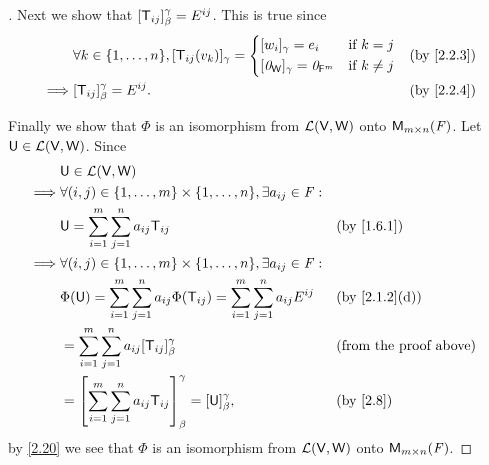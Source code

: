 \begin{proof}[]
  Next we show that \([\mathsf{T}_{i j}]_{\beta}^{\gamma} = E^{i j}\).
  This is true since
  \begin{align*}
             & \forall k \in \set{1, \dots, n}, [\T_{i j}(v_k)]_{\gamma} = \begin{dcases}
                                                                             [w_i]_{\gamma} = e_i                 & \text{if } k = j    \\
                                                                             [\zv_{\W}]_{\gamma} = \zv_{\vs{F}^m} & \text{if } k \neq j
                                                                           \end{dcases} &  & \text{(by \cref{2.2.3})} \\
    \implies & [\T_{i j}]_{\beta}^{\gamma} = E^{i j}.                                       &  & \text{(by \cref{2.2.4})}
  \end{align*}

  Finally we show that \(\Phi\) is an isomorphism from \(\mathcal{L}(\mathsf{V}, \mathsf{W})\) onto \(\mathsf{M}_{{m} \times n}({\mathit{F}})\).
  Let \(\mathsf{U} \in \mathcal{L}(\mathsf{V}, \mathsf{W})\).
  Since
  \begin{align*}
             & \U \in \ls(\V, \W)                                                                                                                                 \\
    \implies & \forall (i, j) \in \set{1, \dots, m} \times \set{1, \dots, n}, \exists a_{i j} \in \F :                                                            \\
             & \U = \sum_{i = 1}^m \sum_{j = 1}^n a_{i j} \T_{i j}                                                             &  & \text{(by \cref{1.6.1})}      \\
    \implies & \forall (i, j) \in \set{1, \dots, m} \times \set{1, \dots, n}, \exists a_{i j} \in \F :                                                            \\
             & \Phi(\U) = \sum_{i = 1}^m \sum_{j = 1}^n a_{i j} \Phi(\T_{i j}) = \sum_{i = 1}^m \sum_{j = 1}^n a_{i j} E^{i j} &  & \text{(by \cref{2.1.2}(d))}   \\
             & = \sum_{i = 1}^m \sum_{j = 1}^n a_{i j} [\T_{i j}]_{\beta}^{\gamma}                                             &  & \text{(from the proof above)} \\
             & = \br{\sum_{i = 1}^m \sum_{j = 1}^n a_{i j} \T_{i j}}_{\beta}^{\gamma} = [\U]_{\beta}^{\gamma},                 &  & \text{(by \cref{2.8})}
  \end{align*}
  by \cref{2.20} we see that \(\Phi\) is an isomorphism from \(\mathcal{L}(\mathsf{V}, \mathsf{W})\) onto \(\mathsf{M}_{{m} \times n}({\mathit{F}})\).
\end{proof}

